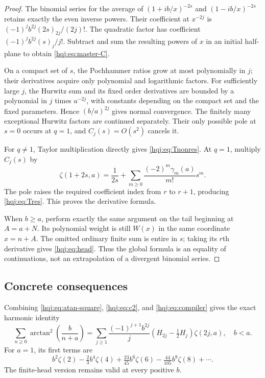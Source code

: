 \documentclass[11pt,letterpaper]{article}
\numberwithin{equation}{section}
\theoremstyle{definition}
\begin{document}
\begin{proof}
The binomial series for the average of $(1+ib/x)^{-2s}$ and
$(1-ib/x)^{-2s}$ retains exactly the even inverse powers. Their
coefficient at $x^{-2j}$ is
$(-1)^jb^{2j}(2s)_{2j}/(2j)!$. The quadratic factor has coefficient
$(-1)^jb^{2j}(s)_j/j!$. Subtract and sum the resulting powers of $x$ in
an initial half-plane to obtain \eqref{hqj:eq:master-C}.

On a compact set of $s$, the Pochhammer ratios grow at most polynomially
in $j$; their derivatives acquire only polynomial and logarithmic
factors. For sufficiently large $j$, the Hurwitz sum and its fixed
order derivatives are bounded by a polynomial in $j$ times
$a^{-2j}$, with constants depending on the compact set and the fixed
parameters. Hence $(b/a)^{2j}$ gives normal convergence. The finitely
many exceptional Hurwitz factors are continued separately. Their only
possible pole at $s=0$ occurs at $q=1$, and $C_j(s)=O(s^2)$ cancels it.

For $q\ne1$, Taylor multiplication directly gives
\eqref{hqj:eq:Tnonres}. At $q=1$, multiply $C_j(s)$ by
\[
\zeta(1+2s,a)=\frac1{2s}
+\sum_{m\ge0}\frac{(-2)^m\gamma_m(a)}{m!}s^m.
\]
The pole raises the required coefficient index from $r$ to $r+1$,
producing \eqref{hqj:eq:Tres}. This proves the derivative formula.

When $b\ge a$, perform exactly the same argument on the tail beginning
at $A=a+N$. Its polynomial weight is still $W(x)$ in the same coordinate
$x=n+A$. The omitted ordinary finite sum is entire in $s$; taking its
$r$th derivative gives \eqref{hqj:eq:head}. Thus the global formula is
an equality of continuations, not an extrapolation of a divergent
binomial series.
\end{proof}

\subsection{Concrete consequences}
Combining \eqref{hqj:eq:atan-square}, \eqref{hqj:eq:c2}, and
\eqref{hqj:eq:compiler} gives the exact harmonic identity
\begin{equation}\label{hqj:eq:atan-harmonic}
\sum_{n\ge0}\arctan^2\!\left(\frac b{n+a}\right)
=\sum_{j\ge1}\frac{(-1)^{j+1}b^{2j}}j
\left(H_{2j}-\tfrac12H_j\right)\zeta(2j,a),\quad b<a.
\end{equation}
For $a=1$, its first terms are
\[
b^2\zeta(2)-\tfrac23b^4\zeta(4)+\tfrac{23}{45}b^6\zeta(6)
-\tfrac{44}{105}b^8\zeta(8)+\cdots.
\]
The finite-head version remains valid at every positive $b$.
\end{document}
